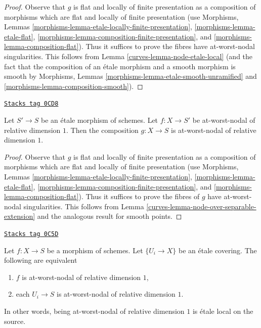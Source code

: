 \begin{proof}

Observe that $g$ is flat and locally of finite presentation as
a composition of morphisms which are flat and locally of finite
presentation (use
Morphisms, Lemmas \ref{morphisms-lemma-etale-locally-finite-presentation},
\ref{morphisms-lemma-etale-flat},
\ref{morphisms-lemma-composition-finite-presentation}, and
\ref{morphisms-lemma-composition-flat}).
Thus it suffices to prove the fibres have at-worst-nodal singularities.
This follows from Lemma \ref{curves-lemma-node-etale-local}
(and the fact that the composition of an \'etale morphism and
a smooth morphism is smooth by
Morphisms, Lemmas \ref{morphisms-lemma-etale-smooth-unramified} and
\ref{morphisms-lemma-composition-smooth}).
\end{proof}

\begin{lemma}
\label{curves-lemma-nodal-family-postcompose-etale}
\href{https://stacks.math.columbia.edu/tag/0CD8}{\texttt{Stacks tag 0CD8}}

Let $S' \to S$ be an \'etale morphism of schemes.
Let $f : X \to S'$ be at-worst-nodal of relative dimension $1$.
Then the composition $g : X \to S$
is at-worst-nodal of relative dimension $1$.
\end{lemma}

\begin{proof}

Observe that $g$ is flat and locally of finite presentation as
a composition of morphisms which are flat and locally of finite
presentation (use
Morphisms, Lemmas \ref{morphisms-lemma-etale-locally-finite-presentation},
\ref{morphisms-lemma-etale-flat},
\ref{morphisms-lemma-composition-finite-presentation}, and
\ref{morphisms-lemma-composition-flat}).
Thus it suffices to prove the fibres of $g$
have at-worst-nodal singularities.
This follows from Lemma \ref{curves-lemma-node-over-separable-extension}
and the analogous result for smooth points.
\end{proof}

\begin{lemma}
\label{curves-lemma-nodal-family-etale-local-source}
\href{https://stacks.math.columbia.edu/tag/0C5D}{\texttt{Stacks tag 0C5D}}

Let $f : X \to S$ be a morphism of schemes. Let $\{U_i \to X\}$
be an \'etale covering. The following are equivalent
\begin{enumerate}
\item $f$ is at-worst-nodal of relative dimension $1$,
\item each $U_i \to S$ is at-worst-nodal of relative dimension $1$.
\end{enumerate}
In other words, being at-worst-nodal of relative dimension $1$
is \'etale local on the source.
\end{lemma}

